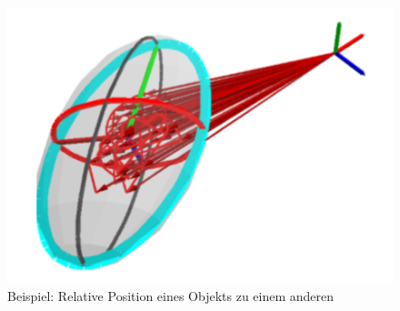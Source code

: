 \begin{figure}
	\centering
	\includegraphics{bilder/relation.pdf}
	\caption{Beispiel: Relative Position eines Objekts zu einem anderen}
	\label{img:relation}
\end{figure}

